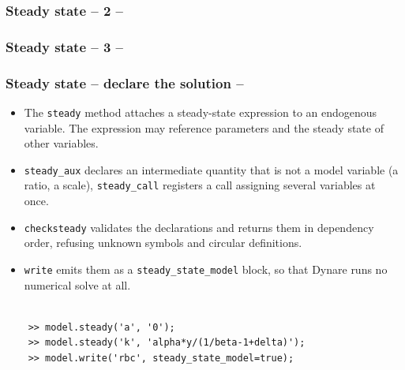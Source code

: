 \documentclass[10pt,slidestop]{beamer}
\theoremstyle{plain}
\begin{document}
\begin{frame}[c,fragile]
  \frametitle{Steady state -- 2 --}

  \scalebox{.6}{
  }

\end{frame}

\begin{frame}[c,fragile]
  \frametitle{Steady state -- 3 --}

  \scalebox{1}{
  }

\end{frame}



\begin{frame}[c,fragile]
  \frametitle{Steady state -- declare the solution --}

  \begin{itemize}

  \item The \verb+steady+ method attaches a steady-state expression to an
    endogenous variable. The expression may reference parameters and the steady
    state of other variables.\newline

  \item \verb+steady_aux+ declares an intermediate quantity that is not a model
    variable (a ratio, a scale), \verb+steady_call+ registers a call assigning
    several variables at once.\newline

  \item \verb+checksteady+ validates the declarations and returns them in
    dependency order, refusing unknown symbols and circular definitions.\newline

  \item \verb+write+ emits them as a \verb+steady_state_model+ block, so that
    Dynare runs no numerical solve at all.

  \end{itemize}

  \begin{lstlisting}[style=MatlabConsole]

    >> model.steady('a', '0');
    >> model.steady('k', 'alpha*y/(1/beta-1+delta)');
    >> model.write('rbc', steady_state_model=true);
  \end{lstlisting}

\end{frame}
\end{document}
